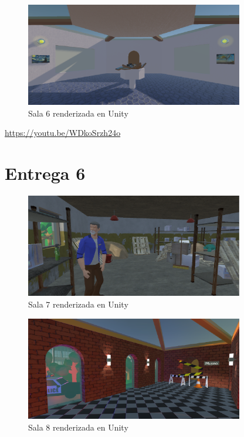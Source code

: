 \begin{figure}[!h]
\begin{center}
\includegraphics[width=0.85\textwidth]{imagenes/7/salas-unity/unity-sala-6.png}
\caption{Sala 6 renderizada en Unity}
\label{fig:unity-sala-6}
\end{center}
\end{figure}


\begin{center}
    \url{https://youtu.be/WDkoSrzh24o}
\end{center}



\section{Entrega 6}

\begin{figure}[!h]
\begin{center}
\includegraphics[width=0.85\textwidth]{imagenes/7/salas-unity/unity-sala-7.png}
\caption{Sala 7 renderizada en Unity}
\label{fig:unity-sala-7}
\end{center}
\end{figure}

\begin{figure}[!h]
\begin{center}
\includegraphics[width=0.85\textwidth]{imagenes/7/salas-unity/unity-sala-8.png}
\caption{Sala 8 renderizada en Unity}
\label{fig:unity-sala-8}
\end{center}
\end{figure}


